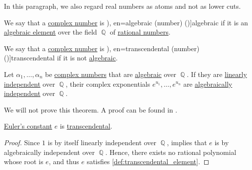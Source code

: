 In this paragraph, we also regard real numbers as atoms and not as lower cuts.

\begin{definition}\label{def:algebraic_number}
  We say that a \hyperref[def:complex_numbers]{complex number} is \term[bg=алгебрично (число), ru=алгебраическое (число) (\cite[358]{Курош1968КурсВысшейАлгебры}), en=algebraic (number) (\cite[16]{Carothers2000RealAnalysis})]{algebraic} if it is an \hyperref[def:algebraic_element]{algebraic element} over the field \( \BbbQ \) of \hyperref[def:rational_numbers]{rational numbers}.
\end{definition}

\begin{definition}\label{def:transcendental_number}
  We say that a \hyperref[def:complex_numbers]{complex number} is \term[bg=трансцендентно (число), ru=трансцендентное (число) (\cite[358]{Курош1968КурсВысшейАлгебры}), en=transcendental (number) (\cite[277]{Jacobson1985BasicAlgebraI})]{transcendental} if it is not \hyperref[def:algebraic_number]{algebraic}.
\end{definition}

\begin{theorem}\label{thm:lindemann_weierstrass}
  Let \( \alpha_1, \ldots, \alpha_n \) be \hyperref[def:complex_numbers]{complex numbers} that are \hyperref[def:algebraic_number]{algebraic} over \( \BbbQ \). If they are \hyperref[def:linear_dependence]{linearly independent} over \( \BbbQ \), their complex exponentials \( e^{u_1}, \ldots, e^{u_n} \) are \hyperref[def:algebraic_dependence]{algebraically independent} over \( \BbbQ \).
\end{theorem}
\begin{comments}
  \item We will not prove this theorem. A proof can be found in \cite[277]{Jacobson1985BasicAlgebraI}.
\end{comments}

\begin{corollary}\label{thm:eulers_constant_is_transcendental}
  \hyperref[def:exponential_function]{Euler's constant} \( e \) is \hyperref[def:transcendental_number]{transcendental}.
\end{corollary}
\begin{proof}
  Since \( 1 \) is by itself linearly independent over \( \BbbQ \),  implies that \( e \) is by algebraically independent over \( \BbbQ \). Hence, there exists no rational polynomial whose root is \( e \), and thus \( e \) satisfies \cref{def:transcendental_element}.
\end{proof}

